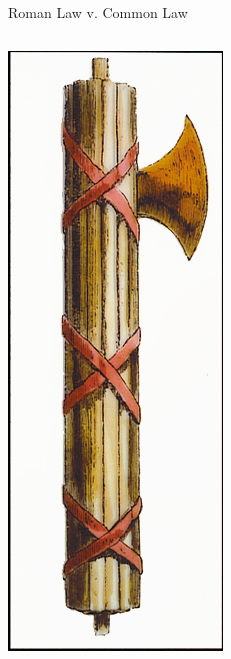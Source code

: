 \begin{frame}{Roman Law v. Common Law}
    \begin{columns}[onlytextwidth]
            \centering
            \includegraphics[height=0.75\textheight]{img/fasces-copy.jpg} \\


\end{columns}
\end{frame}
